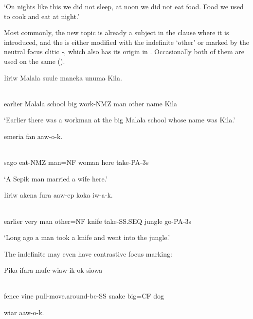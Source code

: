 `On nights like this we did not sleep, at noon we did not eat food. Food we used to cook and eat at night.'

Most commonly, the new topic is already a subject in the clause where it is introduced, and the  is either modified with the indefinite  `other' or marked by the neutral focus clitic \textit{-}, which also has its origin in . Occasionally both of them are used on the same  (). 

\ea%
\label{ex:x1669}
\gll Iiriw  Malala  suule  maneka    unuma  Kila. \\
      \\
\glt
\z

earlier  Malala  school  big  work-NMZ  man  other  name  Kila

`Earlier there was a workman at the big Malala school whose name was Kila.'

\ea%
\label{ex:x1670}
\gll {}    emeria  fan  aaw-o-k. \\
      \\
\glt
\z

sago  eat-NMZ  man=NF  woman  here  take-PA-3s

`A Sepik man married a wife here.'

\ea%
\label{ex:x1671}
\gll Iiriw  akena    fura  aaw-ep  koka  iw-a-k. \\
      \\
\glt
\z

earlier  very  man  other=NF  knife  take-SS.SEQ  jungle  go-PA-3s

`Long ago a man took a knife and went into the jungle.'

The indefinite  may even have contrastive focus marking:

\ea%
\label{ex:x1666}
\gll Pika  ifara  mufe-wiaw-ik-ok    siowa  \\
      \\
\glt
\z

fence  vine  pull-move.around-be-SS  snake  big=CF  dog

wiar  aaw-o-k.

